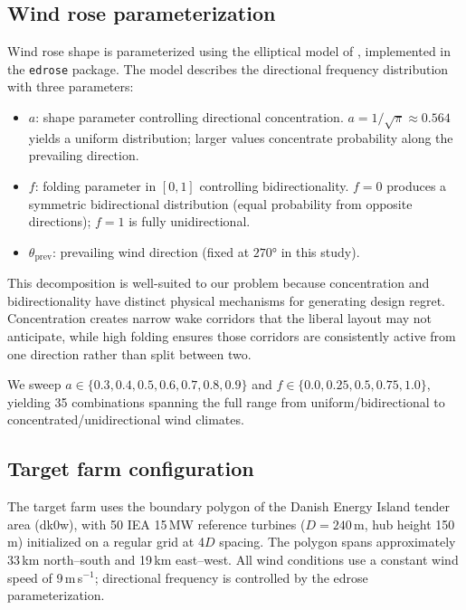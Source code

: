 \documentclass[manuscript, 12pt]{copernicus}
\begin{document}
\subsection{Wind rose parameterization}\label{sec:edrose}

Wind rose shape is parameterized using the elliptical model of \citet{Hart2025}, implemented in the \texttt{edrose} package.
The model describes the directional frequency distribution with three parameters:
\begin{itemize}
    \item $a$: shape parameter controlling directional concentration. $a = 1/\sqrt{\pi} \approx 0.564$ yields a uniform distribution; larger values concentrate probability along the prevailing direction.
    \item $f$: folding parameter in $[0, 1]$ controlling bidirectionality. $f = 0$ produces a symmetric bidirectional distribution (equal probability from opposite directions); $f = 1$ is fully unidirectional.
    \item $\theta_\text{prev}$: prevailing wind direction (fixed at $270°$ in this study).
\end{itemize}

This decomposition is well-suited to our problem because concentration and bidirectionality have distinct physical mechanisms for generating design regret.
Concentration creates narrow wake corridors that the liberal layout may not anticipate, while high folding ensures those corridors are consistently active from one direction rather than split between two.

We sweep $a \in \{0.3, 0.4, 0.5, 0.6, 0.7, 0.8, 0.9\}$ and $f \in \{0.0, 0.25, 0.5, 0.75, 1.0\}$, yielding 35 combinations spanning the full range from uniform/bidirectional to concentrated/unidirectional wind climates.

\subsection{Target farm configuration}

The target farm uses the boundary polygon of the Danish Energy Island tender area (dk0w), with 50 IEA 15\,MW reference turbines ($D = 240$\,m, hub height 150\,m) initialized on a regular grid at 4$D$ spacing.
The polygon spans approximately 33\,km north--south and 19\,km east--west.
All wind conditions use a constant wind speed of 9\,m\,s$^{-1}$; directional frequency is controlled by the edrose parameterization.
\end{document}
